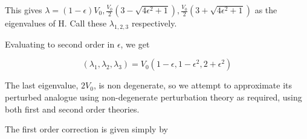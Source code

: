 \begin{alphaparts}
This gives $\lambda = (1-\epsilon)V_0, \frac{V_0}{2} (3-\sqrt{4\epsilon^2 +1}),
\frac{V_0}{2} (3+\sqrt{4\epsilon^2 +1})$ as the eigenvalues of H. Call these
$\lambda_{1, 2, 3}$ respectively.

\begin{comment}

// don't need eigenvectors smh

Eigenvectors for each of the eigenvalues must be calculated. For the first it is
simply $(1, 0, 0)$, same as before, since in this subspace of the state space,
the perturbation creates no off-diagonal elements. So we may reduce to the
$2\times 2$ minor matrix $H_m$ corresponding to the first matrix element and
calculate it's 2D eigenvectors, then take a direct product with the 0-vector in
the first dimension. The eigenvectors $v_i$ for eigenvalues $\lambda_i$ for $i
\in \{2, 3\}$ are given by

\begin{equation}
    H_m v_i = \lambda_i v_i
\end{equation}

This gives $v_2 = (1, \frac{\epsilon}{\lambda_2 - 1})$ and  $v_3 =
(\frac{\lambda_3 - 2}{\epsilon}, 1)$ (scaled, conveniently chosen for each of
the eigenvalues). Substituting the eigenvalues, we get

\begin{align}
    v_2 = (1, \frac{2\epsilon}{1-\sqrt{4\epsilon^2 +1}}) \\
    v_3 = (\frac{-1+\sqrt{4\epsilon^2 +1}}{2\epsilon}, 1)     
\end{align}

Approximating the square roots assuming $\epsilon$ is small, 

\end{comment}

Evaluating to second order in $\epsilon$, we get 

\begin{equation}
    (\lambda_1, \lambda_2, \lambda_3) = V_0 (1-\epsilon, 1-\epsilon^2, 2+\epsilon^2)
\end{equation}

\questionpart
The last eigenvalue, $2V_0$, is non degenerate, so we attempt to approximate its
perturbed analogue using non-degenerate perturbation theory as required, using
both first and second order theories.

The first order correction is given simply by


\end{alphaparts}
